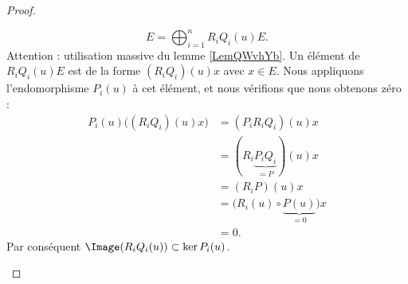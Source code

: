 \begin{proof}
\begin{subproof}
\begin{equation}
			E=\bigoplus_{i=1}^nR_iQ_i(u)E.
		\end{equation}
		Attention : utilisation massive du lemme \ref{LemQWvhYb}. Un élément de \( R_iQ_i(u)E\) est de la forme \( (R_iQ_i)(u)x\) avec \( x\in E\). Nous appliquons l'endomorphisme \( P_i(u)\) à cet élément, et nous vérifions que nous obtenons zéro :
		\begin{subequations}
			\begin{align}
				P_i(u)\big( (R_iQ_i)(u)x \big) & =(P_iR_iQ_i)(u)x                                \\
				                               & =(R_i\underbrace{P_iQ_i}_{=P})(u)x              \\
				                               & =(R_iP)(u)x                                     \\
				                               & =\big( R_i(u)\circ \underbrace{P(u)}_{=0}\big)x \\
				                               & =0.
			\end{align}
		\end{subequations}
		Par conséquent \( \Image(R_iQ_i(u))\subset \ker P_i(u)\).



\end{subproof}
\end{proof}
